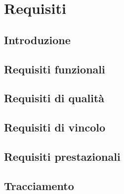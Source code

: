 \section{Requisiti}
\subsection{Introduzione}
\subsection{Requisiti funzionali}
\subsection{Requisiti di qualità}
\subsection{Requisiti di vincolo}
\subsection{Requisiti prestazionali}
\subsection{Tracciamento}